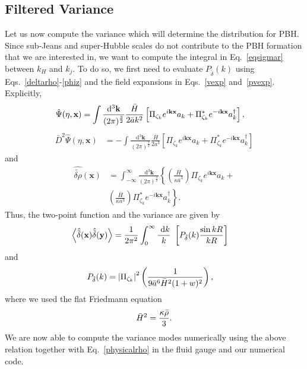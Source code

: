\documentclass[a4paper,11pt]{article}
\begin{document}
\subsection{Filtered Variance}
Let us now compute the variance which will determine the distribution for PBH. Since sub-Jeans and super-Hubble scales do not contribute to the PBH formation that we are interested in, we want to compute the integral in  Eq.~\eqref{eqsigmar} between $k_H$ and $k_j$. To do so, we first need to evaluate $P_{\tilde{\delta}}(k)$ using Eqs.~\eqref{deltarho}-\eqref{phiz} and the field expansions in Eqs.~\eqref{vexp} and~\eqref{pvexp}. Explicitly,
\begin{align}
	\label{psiq}
	\hat{\Psi}(\eta,\textbf{x}) & =\int\frac{\mathrm{d}^3\textbf{k}}{(2\pi)^{\frac{3}{2}}}
	\frac{\bar{H}}{2\Bar{a}k^2}\left[\Pi_{\zeta_{k}} e^{i\textbf{k}\textbf{x}} a_{k} +
	\Pi_{\zeta_{k}}^{ *}e^{-i\textbf{k}\textbf{x}} a_{k}^{\dagger}\right]
	,\end{align}
\begin{align}
	\bar{D}^2\hat{\Psi}(\eta,\textbf{x}) & =
	-\int\frac{\mathrm{d}^3\textbf{k}}{(2\pi)^{\frac{3}{2}}}
	\frac{\bar{H}}{2a^3 }\left[\Pi_{\zeta_{k}} e^{i\textbf{k}\textbf{x}} a_{k} +
	\Pi_{\zeta_{k}}^{*}e^{-i\textbf{k}\textbf{x}} a_{k}^{\dagger}\right]
\end{align}
and
\begin{align}
	\hat{\tilde{\delta\rho}}(\textbf{x}) & =
	\int_{-\infty}^{\infty}\frac{\mathrm{~d}^3\textbf{k}}{(2\pi)^{\frac{3}{2}}}
	\left\{ \left(\frac{\bar{H}}{\kappa \bar{a}^3}\right)\Pi_{\zeta_{k}} e^{i\textbf{k}\textbf{x}} a_{k} +\right. \nonumber                                     \\
	                                     & \left. \left(\frac{\bar{H}}{\kappa a^3}\right)\Pi_{\zeta_{k}}^{*} e^{-i\textbf{k}\textbf{x}} a_{k}^{\dagger}\right\}
	.\end{align}
Thus, the two-point function and the variance are given by
\begin{align}
	\label{2point}
	\left<\hat{\Tilde{\delta}}(\textbf{x})\hat{\Tilde{\delta}}(\textbf{y})\right> & =
	\frac{1}{2\pi^2} \int_0^\infty \frac{\mathrm{~d}k}{k}~\left[P_{\tilde{\delta}}(k)
		\frac{\sin{kR}}{kR} \right]
\end{align}
and
\begin{align}
	P_{\tilde{\delta}}(k) & = \abs{\Pi_{\zeta_{k}}}^2\left( \frac{1}{9\bar{a}^6 \Bar{H}^2(1+w)^2}\right),
\end{align}
where we used the flat Friedmann equation
\begin{align}
	\bar{H}^2 = \frac{\kappa \Bar{\rho}}{3}.
\end{align}
We are now able to compute the variance modes numerically using the above relation together with Eq.~\eqref{physicalrho} in the fluid gauge and our numerical code.
\end{document}
